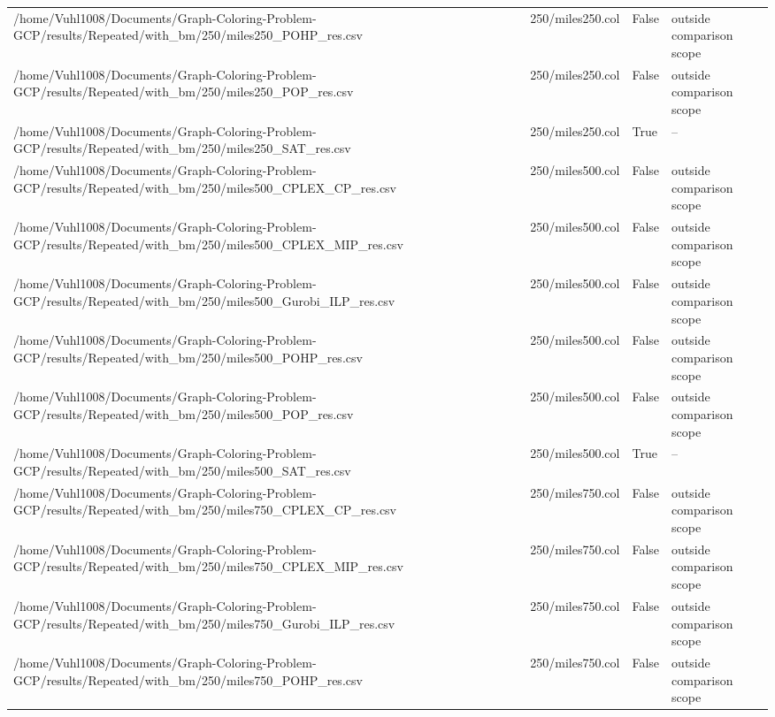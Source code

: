 \begin{table}[htbp]
\begin{tabular}{llll}
/home/Vuhl1008/Documents/Graph-Coloring-Problem-GCP/results/Repeated/with\_bm/250/miles250\_POHP\_res.csv & 250/miles250.col & False & outside comparison scope \\
/home/Vuhl1008/Documents/Graph-Coloring-Problem-GCP/results/Repeated/with\_bm/250/miles250\_POP\_res.csv & 250/miles250.col & False & outside comparison scope \\
/home/Vuhl1008/Documents/Graph-Coloring-Problem-GCP/results/Repeated/with\_bm/250/miles250\_SAT\_res.csv & 250/miles250.col & True & -- \\
/home/Vuhl1008/Documents/Graph-Coloring-Problem-GCP/results/Repeated/with\_bm/250/miles500\_CPLEX\_CP\_res.csv & 250/miles500.col & False & outside comparison scope \\
/home/Vuhl1008/Documents/Graph-Coloring-Problem-GCP/results/Repeated/with\_bm/250/miles500\_CPLEX\_MIP\_res.csv & 250/miles500.col & False & outside comparison scope \\
/home/Vuhl1008/Documents/Graph-Coloring-Problem-GCP/results/Repeated/with\_bm/250/miles500\_Gurobi\_ILP\_res.csv & 250/miles500.col & False & outside comparison scope \\
/home/Vuhl1008/Documents/Graph-Coloring-Problem-GCP/results/Repeated/with\_bm/250/miles500\_POHP\_res.csv & 250/miles500.col & False & outside comparison scope \\
/home/Vuhl1008/Documents/Graph-Coloring-Problem-GCP/results/Repeated/with\_bm/250/miles500\_POP\_res.csv & 250/miles500.col & False & outside comparison scope \\
/home/Vuhl1008/Documents/Graph-Coloring-Problem-GCP/results/Repeated/with\_bm/250/miles500\_SAT\_res.csv & 250/miles500.col & True & -- \\
/home/Vuhl1008/Documents/Graph-Coloring-Problem-GCP/results/Repeated/with\_bm/250/miles750\_CPLEX\_CP\_res.csv & 250/miles750.col & False & outside comparison scope \\
/home/Vuhl1008/Documents/Graph-Coloring-Problem-GCP/results/Repeated/with\_bm/250/miles750\_CPLEX\_MIP\_res.csv & 250/miles750.col & False & outside comparison scope \\
/home/Vuhl1008/Documents/Graph-Coloring-Problem-GCP/results/Repeated/with\_bm/250/miles750\_Gurobi\_ILP\_res.csv & 250/miles750.col & False & outside comparison scope \\
/home/Vuhl1008/Documents/Graph-Coloring-Problem-GCP/results/Repeated/with\_bm/250/miles750\_POHP\_res.csv & 250/miles750.col & False & outside comparison scope \\

\end{tabular}
\end{table}
